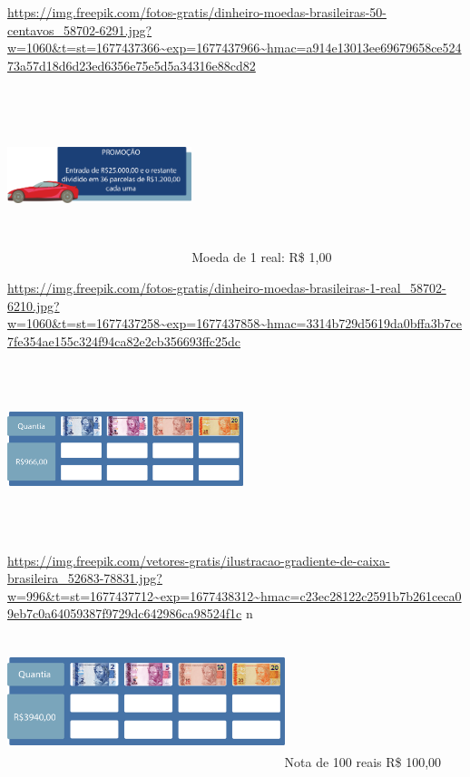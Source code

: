 {\url{https://img.freepik.com/fotos-gratis/dinheiro-moedas-brasileiras-50-centavos_58702-6291.jpg?w=1060\&t=st=1677437366~exp=1677437966~hmac=a914e13013ee69679658ce52473a57d18d6d23ed6356e75e5d5a34316e88cd82}

\includegraphics[width=2.11667in,height=2.01180in]{media/image68.png}Moeda
de 1 real: R\$ 1,00

\url{https://img.freepik.com/fotos-gratis/dinheiro-moedas-brasileiras-1-real_58702-6210.jpg?w=1060\&t=st=1677437258~exp=1677437858~hmac=3314b729d5619da0bffa3b7ce7fe354ae155c324f94ca82e2cb356693ffc25dc}

\includegraphics[width=2.71068in,height=1.97500in]{media/image69.png}%

\url{https://img.freepik.com/vetores-gratis/ilustracao-gradiente-de-caixa-brasileira_52683-78831.jpg?w=996\&t=st=1677437712~exp=1677438312~hmac=c23ec28122c2591b7b261ceca09eb7c0a64059387f9729dc642986ca98524f1c}
n

\includegraphics[width=3.18285in,height=1.50833in]{media/image70.png}Nota
de 100 reais R\$ 100,00

}
